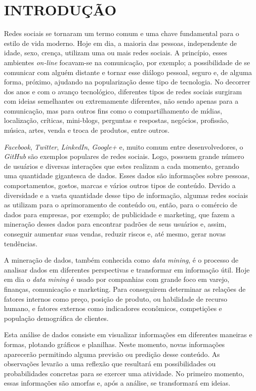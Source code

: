 \chapter{INTRODUÇÃO}\label{ch:introducao}

Redes sociais se tornaram um termo comum e uma chave fundamental para o estilo de vida moderno. Hoje em dia, a maioria das pessoas, independente de idade, sexo, crença, utilizam uma ou mais redes sociais. A princípio, esses ambientes \textit{on-line} focavam-se na comunicação, por exemplo; a possibilidade de se comunicar com alguém distante e tornar esse diálogo pessoal, seguro e, de alguma forma, próximo, ajudando na popularização desse tipo de tecnologia. No decorrer dos anos e com o avanço tecnológico, diferentes tipos de redes sociais surgiram com ideias semelhantes ou extremamente diferentes, não sendo apenas para a comunicação, mas para outros fins como o compartilhamento de mídias, localização, críticas, mini-blogs, perguntas e respostas, negócios, profissão, música, artes, venda e troca de produtos, entre outros.

\textit{Facebook}, \textit{Twitter}, \textit{LinkedIn}, \textit{Google+} e, muito comum entre desenvolvedores, o \textit{GitHub} são exemplos populares de redes sociais. Logo, possuem grande número de usuários e diversas interações que estes realizam a cada momento, gerando uma quantidade gigantesca de dados. Esses dados são informações sobre pessoas, comportamentos, gostos, marcas e vários outros tipos de conteúdo. Devido a diversidade e a vasta quantidade desse tipo de informação, algumas redes sociais as utilizam para o aprimoramento de conteúdo ou, então, para o comércio de dados para empresas, por exemplo; de publicidade e marketing, que fazem a mineração desses dados para encontrar padrões de seus usuários e, assim, conseguir aumentar suas vendas, reduzir riscos e, até mesmo, gerar novas tendências.

A mineração de dados, também conhecida como \textit{data mining}, é o processo de analisar dados em diferentes perspectivas e transformar em informação útil. Hoje em dia o \textit{data mining} é usado por companhias com grande foco em varejo, finanças, comunicação e marketing. Para conseguirem determinar as relações de fatores internos como preço, posição de produto, ou habilidade de recurso humano, e fatores externos como indicadores econômicos, competições e população demográfica de clientes.

Esta análise de dados consiste em visualizar informações em diferentes maneiras e formas, plotando gráficos e planilhas. Neste momento, novas informações aparecerão permitindo alguma previsão ou predição desse conteúdo. As observações levarão a uma reflexão que resultará em possibilidades ou probabilidades concretas para se exercer uma atividade. No primeiro momento, essas informações são amorfas e, após a análise, se transformará em ideias.

